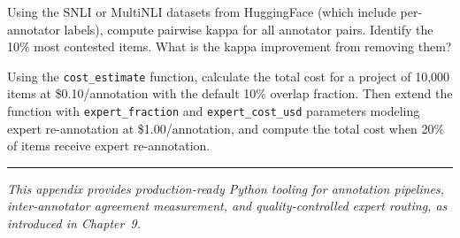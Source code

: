 \begin{Exercise}
Using the SNLI or MultiNLI datasets from HuggingFace (which include per-annotator labels), compute pairwise kappa for all annotator pairs. Identify the 10\% most contested items. What is the kappa improvement from removing them?
\end{Exercise}

\begin{Exercise}
Using the \texttt{cost\_estimate} function, calculate the total cost for a project of 10{,}000 items at \$0.10/annotation with the default 10\% overlap fraction. Then extend the function with \texttt{expert\_fraction} and \texttt{expert\_cost\_usd} parameters modeling expert re-annotation at \$1.00/annotation, and compute the total cost when 20\% of items receive expert re-annotation.
\end{Exercise}

\bigskip
\begin{center}
\rule{0.5\textwidth}{0.4pt}
\end{center}
\bigskip

\noindent\textit{This appendix provides production-ready Python tooling for annotation pipelines, inter-annotator agreement measurement, and quality-controlled expert routing, as introduced in Chapter~9.}
\apxnumoff

